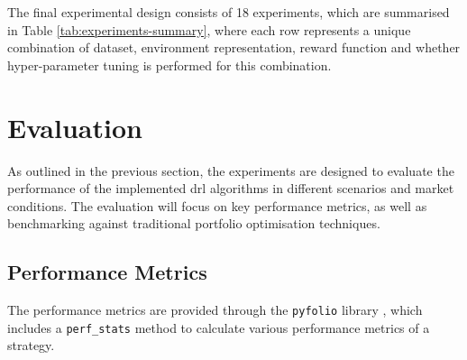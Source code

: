 The final experimental design consists of 18 experiments, which are summarised in Table \ref{tab:experiments-summary}, where each row represents a unique combination of dataset, environment representation, reward function and whether hyper-parameter tuning is performed for this combination.



\section{Evaluation} \label{sec:evaluation}

As outlined in the previous section, the experiments are designed to evaluate the performance of the implemented \acrshort{drl} algorithms in different scenarios and market conditions. The evaluation will focus on key performance metrics, as well as benchmarking against traditional portfolio optimisation techniques.

\subsection{Performance Metrics} \label{sec:performance-metrics}

The performance metrics are provided through the \texttt{pyfolio} library \cite{pyfolio}, which includes a \texttt{perf\_stats} method to calculate various performance metrics of a strategy. 

